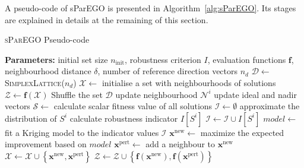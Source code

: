 \documentclass[10pt]{llncs}
\newcommand{\brr}[1]{{\left({#1}\right)}} %
\newcommand{\brf}[1]{\left\lbrace{#1}\right\rbrace} %
\newcommand{\I}[1]{I\!\left[{#1}\right]} %
\newcommand{\vx}{\mathbf{x}} %
\newcommand{\vf}{\mathbf{f}} %
\newcommand{\vd}{\mathbf{d}} %
\newcommand{\DSet}{\mathcal{D}} %
\newcommand{\NSet}{\mathcal{N}} %
\newcommand{\XSet}{\mathcal{X}} %
\newcommand{\ZSet}{\mathcal{Z}} %
\newcommand{\SSet}{\mathcal{S}} %
\newcommand{\ISet}{\mathcal{I}} %
\begin{document}
A pseudo-code of sParEGO is presented in Algorithm~\ref{alg:sParEGO}.
Its stages are explained in details at the remaining of this section.

\begin{algorithm}
\caption{\textsc{sParEGO} Pseudo-code}
\label{alg:sParEGO}
\begin{algorithmic}[1]
	\Statex \textbf{Parameters:} initial set size $n_\text{init}$, robustness criterion $I$, 
	\Statex \hspace{20mm} evaluation functions $\vf$, neighbourhood distance $\delta$,
	\Statex \hspace{20mm} number of reference direction vectors $n_d$
	\State $\DSet \leftarrow$ \textsc{SimplexLattice}($n_d$) 
	\State $\XSet \leftarrow$ initialise a set with neighbourhoods of solutions 
	\State $\ZSet \leftarrow \vf\brr{\XSet}$ 
		\State Shuffle the set $\DSet$
		\ForAll{$\vd\in\DSet$}
			\ForAll{$\vx^i\in\XSet$}
				\State update neighbourhood $\NSet^i$ 
			\EndFor
			\State update ideal and nadir vectors
			\State $\SSet \leftarrow$ calculate scalar fitness value of all solutions 
			\State $\ISet \leftarrow \emptyset$
			\ForAll{$\vx^i\in\XSet$}
				\State approximate the distribution of $S^i$ 
				\State calculate robustness indicator $\I{S^i}$ 
				\State $\ISet \leftarrow \ISet \cup \I{S^i}$
			\EndFor
			\State $model \leftarrow$ fit a Kriging model to the indicator values $\ISet$ 
			\State $\vx^\text{new} \leftarrow$ maximize the expected improvement based on $model$
			\State $\vx^\text{pert} \leftarrow$ add a neighbour to $\vx^\text{new}$  
			\State $\XSet \leftarrow \XSet \cup \brf{\vx^\text{new}, \vx^\text{pert}}$
			\State $\ZSet \leftarrow \ZSet \cup \brf{\vf\brr{\vx^\text{new}}, \vf\brr{\vx^\text{pert}}}$ 
		\EndFor
	\EndWhile
\end{algorithmic}
\end{algorithm}
\end{document}
